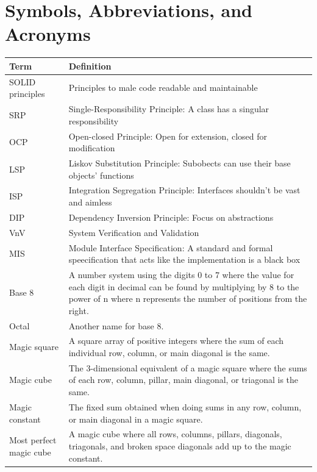 \documentclass[12pt, titlepage]{article}
\renewcommand{\wss}[1]{}
\begin{document}
\newpage

\tableofcontents

\listoftables
\wss{Remove this section if it isn't needed}

\newpage

\section{Symbols, Abbreviations, and Acronyms}

\begin{longtable}{p{} p{}}
\toprule
Term & Definition\\
\midrule
SOLID principles & Principles to male code readable and maintainable \\
SRP & Single-Responsibility Principle: A class has a singular responsibility \\
OCP & Open-closed Principle: Open for extension, closed for modification \\
LSP & Liskov Substitution Principle: Subobects can use their base objects' functions \\
ISP & Integration Segregation Principle: Interfaces shouldn't be vast and aimless \\
DIP & Dependency Inversion Principle: Focus on abstractions \\
VnV & System Verification and Validation \\
MIS & Module Interface Specification: A standard and formal speecification that acts like the implementation is a black box \\
Base 8 & A number system using the digits 0 to 7 where the value for each digit in decimal can be found by multiplying by 8 to the power of n where n represents the number of positions from the right. \\
Octal & Another name for base 8. \\
Magic square & A square array of positive integers where the sum of each individual row, column, or main diagonal is the same.\\
Magic cube & The 3-dimensional equivalent of a magic square where the sums of each row, column, pillar, main diagonal, or triagonal is the same. \\
Magic constant & The fixed sum obtained when doing sums in any row, column, or main diagonal in a magic square. \\
Most perfect magic cube & A magic cube where all rows, columns, pillars, diagonals, triagonals, and broken space diagonals add up to the magic constant. \\

\end{longtable}
\end{document}
